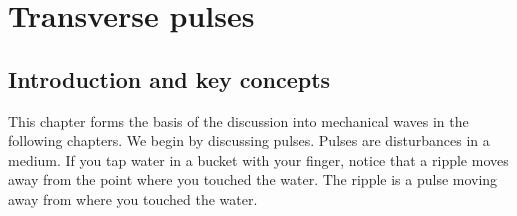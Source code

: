          \chapter{Transverse pulses}
    \setcounter{figure}{1}
    \setcounter{subfigure}{1}
    \label{21d48a6f8839b4b265192acd9ea3d978}
         \section{Introduction and key concepts}
    \nopagebreak
    \label{m38801*cid2}
      \label{m38801*id312450}This chapter forms the basis of the discussion into mechanical waves in the following chapters. We begin by discussing pulses. Pulses are disturbances in a medium. If you tap water in a bucket with your finger, notice that a ripple moves away from the point where you touched the water. The ripple is a pulse moving away from where you touched the water. 

    \label{m38801*cid3}
